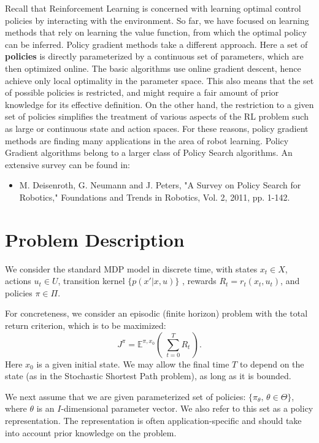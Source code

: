 Recall that Reinforcement Learning is concerned with learning optimal control policies by interacting with the environment. So far, we have focused on learning methods that rely on learning the value function, from which the optimal policy can be inferred.
Policy gradient methods take a different approach. Here a set of \textbf{policies} is directly parameterized by a continuous set of parameters, which are then optimized online. The basic algorithms use online gradient descent, hence achieve only local optimality in the parameter space.
This also means that the set of possible policies is restricted, and might require a fair amount of prior knowledge for its effective definition. On the other hand, the restriction to a given set of policies simplifies the treatment of various aspects of the RL problem such as large or continuous state and action spaces. For these reasons, policy gradient methods are finding many applications in the area of robot learning.
Policy Gradient algorithms belong to a larger class of Policy Search algorithms. An extensive survey can be found in:
\begin{itemize}
  \item M. Deisenroth, G. Neumann and J. Peters, "A Survey on Policy Search for Robotics," Foundations and Trends in Robotics, Vol. 2, 2011, pp. 1-142.
\end{itemize}
%

\section{Problem Description}

We consider the standard MDP model in discrete time, with states  ${x_t} \in X$, actions ${u_t} \in U$, transition kernel $\{ p(x'|x,u)\} $ , rewards  ${R_t} = {r_t}({x_t},{u_t})$, and policies $\pi  \in \Pi $.

For concreteness, we consider an episodic (finite horizon) problem with the total return criterion, which is to be maximized:
\[{J^\pi } = {\mathbb E^{\pi ,{x_0}}}(\;\sum\limits_{t = 0}^T {{R_t}} \,).\]
Here ${x_0}$ is a given initial state. We may allow the final time $T$ to depend on the state (as in the Stochastic Shortest Path problem), as long as it is bounded.

We next assume that we are given parameterized set of policies: $\{ {\pi _\theta },\,\theta  \in \Theta \} $, where $\theta $ is an $I$-dimensional parameter vector. We also refer to this set as a policy representation. The representation is often application-specific and should take into account prior knowledge on the problem.

